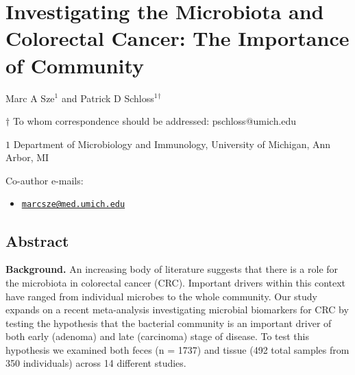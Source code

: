 \documentclass[12pt,]{article}
\title{}
\author{}
\date{}
\providecommand{\tightlist}{%
  \setlength{\itemsep}{0pt}\setlength{\parskip}{0pt}}
\begin{document}
\section{Investigating the Microbiota and Colorectal Cancer: The
Importance of
Community}\label{investigating-the-microbiota-and-colorectal-cancer-the-importance-of-community}

\begin{center}
\vspace{25mm}

Marc A Sze${^1}$ and Patrick D Schloss${^1}$${^\dagger}$

\vspace{20mm}

$\dagger$ To whom correspondence should be addressed: pschloss@umich.edu

$1$ Department of Microbiology and Immunology, University of Michigan, Ann Arbor, MI




\end{center}

Co-author e-mails:

\begin{itemize}
\tightlist
\item
  \href{mailto:marcsze@med.umich.edu}{\nolinkurl{marcsze@med.umich.edu}}
\end{itemize}

\newpage

\linenumbers

\subsection{Abstract}\label{abstract}

\textbf{Background.} An increasing body of literature suggests that
there is a role for the microbiota in colorectal cancer (CRC). Important
drivers within this context have ranged from individual microbes to the
whole community. Our study expands on a recent meta-analysis
investigating microbial biomarkers for CRC by testing the hypothesis
that the bacterial community is an important driver of both early
(adenoma) and late (carcinoma) stage of disease. To test this hypothesis
we examined both feces (n = 1737) and tissue (492 total samples from 350
individuals) across 14 different studies.
\end{document}
